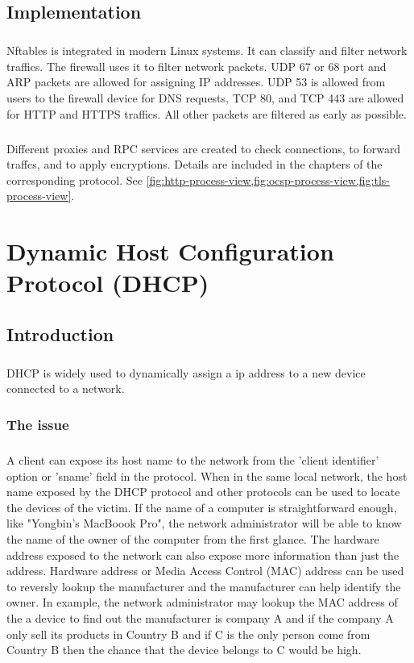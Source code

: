 \documentclass[mscthesis]{usiinfthesis}
\begin{document}
\section{Implementation}
\paragraph{}
Nftables is integrated in modern Linux systems. It can classify and filter network traffics. The firewall uses it to filter network packets. UDP 67 or 68 port and ARP packets are allowed for assigning IP addresses. UDP 53 is allowed from users to the firewall device for DNS requests, TCP 80, and TCP 443 are allowed for HTTP and HTTPS traffics. All other packets are filtered as early as possible.
\paragraph{}
Different proxies and RPC services are created to check connections, to forward traffcs, and to apply encryptions. Details are included in the chapters of the corresponding protocol. See \cref{fig:http-process-view,fig:ocsp-process-view,fig:tls-process-view}.

\chapter{Dynamic Host Configuration Protocol (DHCP)}

\section{Introduction}
\paragraph{}
DHCP is widely used to dynamically assign a ip address to a new device connected to a network.

\subsection{The issue}
\paragraph{}
A client can expose its host name to the network from the 'client identifier' option or 'sname' field in the protocol. When in the same local network, the host name exposed by the DHCP protocol and other protocols can be used to locate the devices of the victim. If the name of a computer is straightforward enough, like "Yongbin's MacBoook Pro", the network administrator will be able to know the name of the owner of the computer from the first glance. The hardware address exposed to the network can also expose more information than just the address. Hardware address or Media Access Control (MAC) address can be used to reversly lookup the manufacturer and the manufacturer can help identify the owner. In example, the network administrator may lookup the MAC address of the a device to find out the manufacturer is company A and if the company A only sell its products in Country B and if C is the only person come from Country B then the chance that the device belongs to C would be high.
\end{document}
